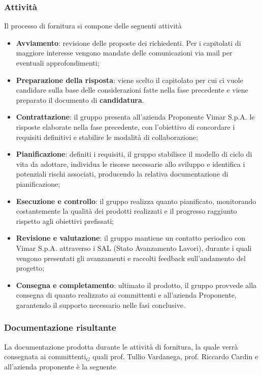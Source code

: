 \documentclass[10pt, letterpaper]{article}
\begin{document}
\subsubsection{Attività}
Il processo di fornitura si compone delle seguenti attività
\begin{itemize}
    \item \textbf{Avviamento}: revisione delle proposte dei richiedenti. Per i capitolati di maggiore interesse vengono mandate delle comunicazioni via mail per eventuali approfondimenti;

    \item \textbf{Preparazione della risposta}: viene scelto il capitolato per cui ci vuole candidare sulla base delle considerazioni fatte nella fase precedente e viene preparato il documento di \textbf{candidatura}.

     \item \textbf{Contrattazione}: il gruppo presenta all'azienda Proponente 
    Vimar S.p.A. le risposte elaborate nella fase precedente, con l'obiettivo 
    di concordare i requisiti definitivi e stabilire le modalità di collaborazione;

    \item \textbf{Pianificazione}: definiti i requisiti, il gruppo stabilisce 
    il modello di ciclo di vita da adottare, individua le risorse necessarie 
    allo sviluppo e identifica i potenziali rischi associati, producendo 
    la relativa documentazione di pianificazione;

    \item \textbf{Esecuzione e controllo}: il gruppo realizza quanto pianificato, 
    monitorando costantemente la qualità dei prodotti realizzati e il progresso 
    raggiunto rispetto agli obiettivi prefissati;

    \item \textbf{Revisione e valutazione}: il gruppo mantiene un contatto 
    periodico con Vimar S.p.A. attraverso i SAL (Stato Avanzamento Lavori), 
    durante i quali vengono presentati gli avanzamenti e raccolti feedback 
    sull'andamento del progetto;

    \item \textbf{Consegna e completamento}: ultimato il prodotto, il gruppo 
    provvede alla consegna di quanto realizzato ai committenti e all'azienda 
    Proponente, garantendo il supporto necessario nelle fasi conclusive.
\end{itemize}

\subsubsection{Documentazione risultante}
La documentazione prodotta durante le attività di fornitura, la quale verrà consegnata ai committenti$_{G}$ quali prof. Tullio Vardanega, prof. Riccardo Cardin e all'azienda proponente è la seguente
\end{document}
